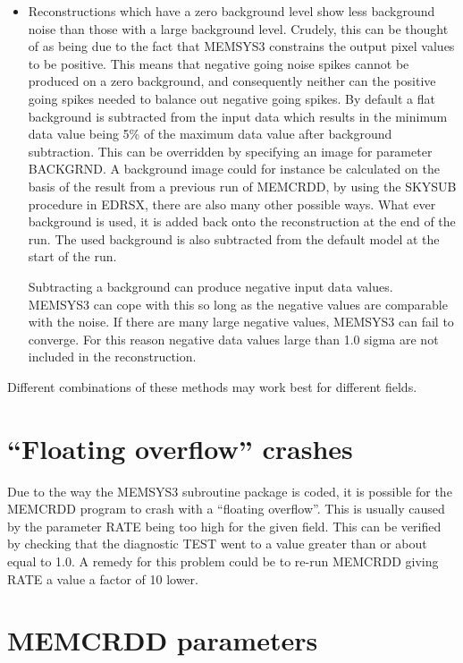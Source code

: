 \begin {itemize}
\item Reconstructions which have a zero background level show less background
noise than those with a large background level. Crudely, this can be thought of
as being due to the fact that MEMSYS3 constrains the output pixel values to be
positive. This means that negative going noise spikes cannot be produced on a
zero background, and consequently neither can the positive going spikes needed
to balance out negative going spikes. By default a flat background is
subtracted from the input data which results in the minimum data value being
5\% of the maximum data value after background subtraction. This can be
overridden by specifying an image for parameter BACKGRND. A background image
could for instance be calculated on the basis of the result from a previous run
of MEMCRDD, by using the SKYSUB procedure in EDRSX, there are also many other
possible ways. What ever background is used, it is added back onto the
reconstruction at the end of the run. The used background is also subtracted
from the default model at the start of the run.

Subtracting a background can produce negative input data values. MEMSYS3 can
cope  with this so long as the negative values are comparable with the noise.
If there  are many large negative values, MEMSYS3 can fail to converge. For
this reason  negative data values large than 1.0 sigma are not included in the
reconstruction.

\end {itemize}

Different combinations of these methods may work best for different fields.

\section {``Floating overflow'' crashes}

Due to the way the MEMSYS3 subroutine package is coded, it is possible for the
MEMCRDD program to crash with a ``floating overflow''. This is usually caused
by  the parameter RATE being too high for the given field. This can be verified
by  checking that the diagnostic TEST went to a value greater than or about
equal to  1.0. A remedy for this problem could be to re-run MEMCRDD giving RATE
a value a  factor of 10 lower.

\appendix
\section {MEMCRDD parameters}
\label {APP:PARS}

